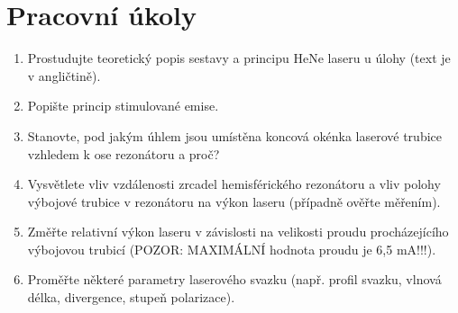 \documentclass[a4paper]{article}
\author{Vladislav Wohlrath}
\begin{document}
\begin{titlepage}

\end{titlepage}

\section*{Pracovní úkoly}
\begin{enumerate}
\item Prostudujte teoretický popis sestavy a principu HeNe laseru u úlohy (text je v angličtině).
\item Popište princip stimulované emise.
\item Stanovte, pod jakým úhlem jsou umístěna koncová okénka laserové trubice vzhledem k ose rezonátoru a proč?
\item Vysvětlete vliv vzdálenosti zrcadel hemisférického rezonátoru a vliv polohy výbojové trubice v rezonátoru na výkon laseru (případně ověřte měřením).
\item Změřte relativní výkon laseru v závislosti na velikosti proudu procházejícího výbojovou trubicí (POZOR: MAXIMÁLNÍ hodnota proudu je 6,5 mA!!!).
\item Proměřte některé parametry laserového svazku (např. profil svazku, vlnová délka, divergence, stupeň polarizace).

\end{enumerate}

\nocite{skripta}









\printbibliography[title={Seznam použité literatury}]
\end{document}
